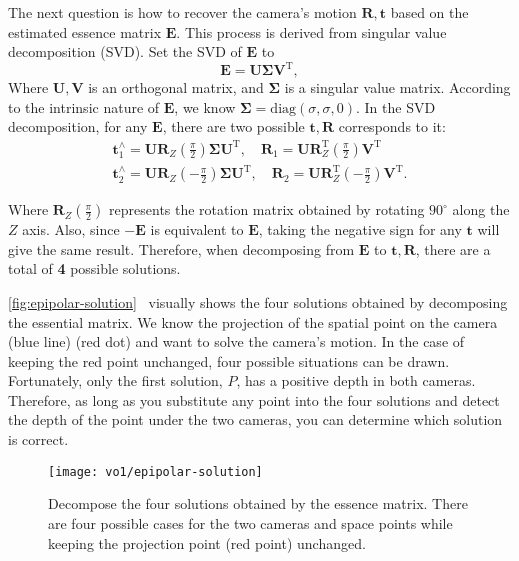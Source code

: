 The next question is how to recover the camera's motion $\bm{R}, \bm{t}$ based on the estimated essence matrix $\bm{E}$. This process is derived from singular value decomposition (SVD). Set the SVD of $\bm{E}$ to
\begin{equation}
\bm{E} = \bm{U} \bm{\Sigma} \bm{V}^\mathrm{T},
\end{equation}
Where $\bm{U}, \bm{V}$ is an orthogonal matrix, and $\bm{\Sigma}$ is a singular value matrix. According to the intrinsic nature of $\bm{E}$, we know $\bm{\Sigma} = \mathrm{diag}( \sigma, \sigma, 0 )$. In the SVD decomposition, for any $\bm{E}$, there are two possible $\bm{t}, \bm{R}$ corresponds to it:
\begin{equation}
\begin{array}{l}
\bm{t}_1^ \wedge = \bm{U}{\bm{R}_Z}(\frac{\pi }{2}) \bm{\Sigma} {\bm{U}^\mathrm{ T}}, \quad {\bm{R}_1} = \bm{U} \bm{R}_Z^\mathrm{T}(\frac{\pi }{2}){ \bm{V}^\mathrm{T}}\\
\bm{t}_2^ \wedge = \bm{U}{\bm{R}_Z}( - \frac{\pi }{2})\bm{\Sigma} {\bm{U}^\mathrm {T}}, \quad {\bm{R}_2} = \bm{U} \bm{R}_Z^\mathrm{T}( - \frac{\pi }{2}){\bm{V}^\mathrm{T}}.
\end{array}
\end{equation}

Where $\bm{R}_Z(\frac{\pi }{2})$ represents the rotation matrix obtained by rotating $90^\circ$ along the $Z$ axis. Also, since $-\bm{E}$ is equivalent to $\bm{E}$, taking the negative sign for any $\bm{t}$ will give the same result. Therefore, when decomposing from $\bm{E}$ to $\bm{t}, \bm{R}$, there are a total of \textbf{4} possible solutions.

\autoref{fig:epipolar-solution}~ visually shows the four solutions obtained by decomposing the essential matrix. We know the projection of the spatial point on the camera (blue line) (red dot) and want to solve the camera's motion. In the case of keeping the red point unchanged, four possible situations can be drawn. Fortunately, only the first solution, $P$, has a positive depth in both cameras. Therefore, as long as you substitute any point into the four solutions and detect the depth of the point under the two cameras, you can determine which solution is correct.

\begin{figure}[!htp]
\centering
\texttt{[image: vo1/epipolar-solution]}
\caption{Decompose the four solutions obtained by the essence matrix. There are four possible cases for the two cameras and space points while keeping the projection point (red point) unchanged. }
\label{fig:epipolar-solution}
\end{figure}

